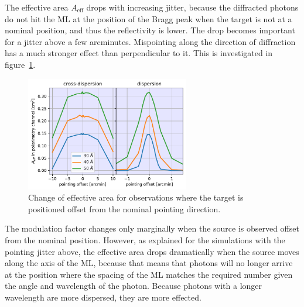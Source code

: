 \documentclass[]{spie}  %
\begin{document}
The effective area $A_{\mathrm{eff}}$ drops with increasing jitter,
because the diffracted photons do not hit the ML at the position of
the Bragg peak when the target is not at a nominal position, and thus
the reflectivity is lower. The drop becomes important for a jitter
above a few arcminutes. Mispointing along the direction of diffraction
has a much stronger effect than perpendicular to it. This is
investigated in figure~\ref{fig:offset_point}.

\begin{figure} [ht]
  \begin{center}
    \includegraphics[height=5cm]{offset_point.pdf}
  \end{center}
  \caption
      { \label{fig:offset_point}Change of effective area for observations where the target is positioned offset from the nominal pointing direction. 
}
\end{figure}

The modulation factor changes only marginally when the source is
observed offset from the nominal position. However, as explained for
the simulations with the pointing jitter above, the effective area
drops dramatically when the source moves along the axis of the ML,
because that means that photons will no longer arrive at the position
where the spacing of the ML matches the required number given the
angle and wavelength of the photon. Because photons with a longer
wavelength are more dispersed, they are more effected.
\end{document}
